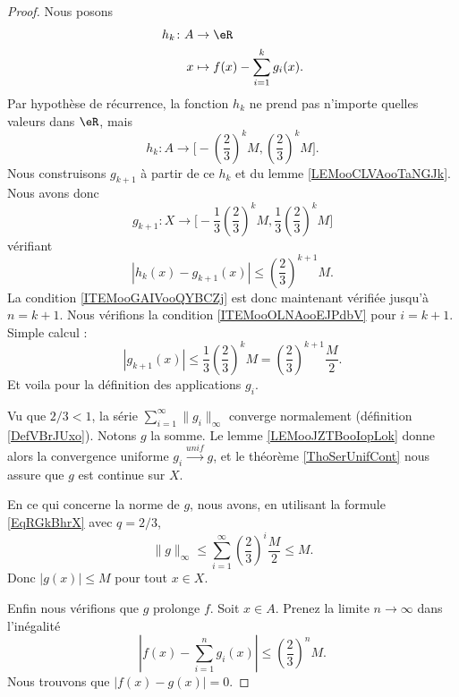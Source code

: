 \begin{proof}
    Nous posons 
    \begin{equation}
        \begin{aligned}
            h_k\colon A&\to \eR \\
            x&\mapsto f(x)-\sum_{i=1}^kg_i(x). 
        \end{aligned}
    \end{equation}
    Par hypothèse de récurrence, la fonction \( h_k\) ne prend pas n'importe quelles valeurs dans \( \eR\), mais
    \begin{equation}
        h_k\colon A\to \mathopen\big[  -\left( \frac{ 2 }{ 3 } \right)^kM  , \left( \frac{ 2 }{ 3 } \right)^kM \mathclose\big].
    \end{equation}
    Nous construisons \( g_{k+1}\) à partir de ce \( h_k\) et du lemme \ref{LEMooCLVAooTaNGJk}. Nous avons donc
    \begin{equation}
        g_{k+1}\colon X\to \mathopen\Big[  -\frac{1}{ 3 }\left( \frac{ 2 }{ 3 } \right)^kM  , \frac{1}{ 3 }\left( \frac{ 2 }{ 3 } \right)^kM \mathclose\Big] 
    \end{equation}
    vérifiant
    \begin{equation}
        | h_k(x)-g_{k+1}(x) |\leq \left( \frac{ 2 }{ 3 } \right)^{k+1}M.
    \end{equation}
    La condition \ref{ITEMooGAIVooQYBCZj} est donc maintenant vérifiée jusqu'à \( n=k+1\). Nous vérifions la condition \ref{ITEMooOLNAooEJPdbV} pour \( i=k+1\). Simple calcul :
    \begin{equation}
        | g_{k+1}(x) |\leq \frac{1}{ 3 }\left( \frac{ 2 }{ 3 } \right)^kM=\left( \frac{ 2 }{ 3 } \right)^{k+1}\frac{ M }{ 2 }.
    \end{equation}
    Et voila pour la définition des applications \( g_i\).

    Vu que \( 2/3<1\), la série \( \sum_{i=1}^{\infty}\| g_i \|_{\infty}\) converge normalement (définition \ref{DefVBrJUxo}). Notons \( g\) la somme. Le lemme \ref{LEMooJZTBooIopLok} donne alors la convergence uniforme \( g_i\stackrel{unif}{\longrightarrow}g\), et le théorème \ref{ThoSerUnifCont} nous assure que \( g\) est continue sur \( X\).

    En ce qui concerne la norme de \( g\), nous avons, en utilisant la formule \eqref{EqRGkBhrX} avec \( q=2/3\),
    \begin{equation}
        \| g \|_{\infty}\leq \sum_{i=1}^{\infty}\left( \frac{ 2 }{ 3 } \right)^i\frac{ M }{2}\leq M.
    \end{equation}
    Donc \( | g(x) |\leq M\) pour tout \( x\in X\).

    Enfin nous vérifions que \( g\) prolonge \( f\). Soit \( x\in A\). Prenez la limite \( n\to \infty\) dans l'inégalité
    \begin{equation}
        | f(x)-\sum_{i=1}^ng_i(x) |\leq \left( \frac{ 2 }{ 3 } \right)^nM.
    \end{equation}
    Nous trouvons que \( | f(x)-g(x) |=0\).
\end{proof}

